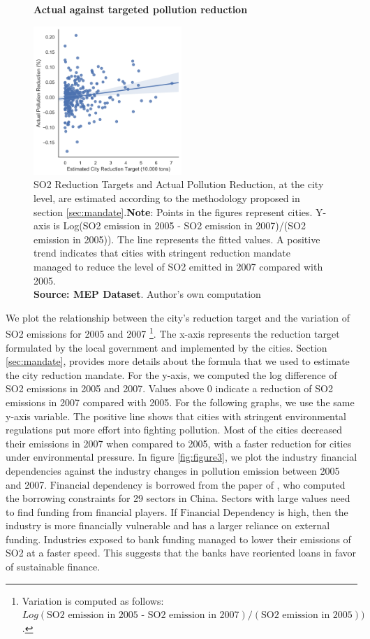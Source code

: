 \documentclass[12pt]{article}
\begin{document}
\begin{figure}[ht]
    \centering
    \textbf{Actual against targeted pollution reduction}\par\medskip
    \includegraphics[width=0.5\textwidth]{fig_2}
    \caption{SO2 Reduction Targets and Actual Pollution Reduction, at the city level, are estimated according to the methodology proposed in section \ref{sec:mandate}.\textbf{Note}: Points in the figures represent cities. Y-axis is Log(SO2 emission in 2005 - SO2 emission in 2007)/(SO2 emission in 2005)). The line represents the fitted values. A positive trend indicates that cities with stringent reduction mandate managed to reduce the level of SO2 emitted in 2007 compared with 2005. \\
    \textbf{Source: MEP Dataset}. Author's own computation}
    \label{fig:figure2}
\end{figure}

We plot the relationship between the city’s reduction target and the variation of SO2 emissions for 2005 and 2007 \footnote{Variation is computed as follows: $Log(\text{SO2 emission in 2005 - SO2 emission in 2007})/(\text{SO2 emission in 2005}))$.}. The x-axis represents the reduction target formulated by the local government and implemented by the cities. Section \ref{sec:mandate}, provides more details about the formula that we used to estimate the city reduction mandate. For the y-axis, we computed the log difference of SO2 emissions in 2005 and 2007. Values above 0 indicate a reduction of SO2 emissions in 2007 compared with 2005. For the following graphs, we use the same y-axis variable. The positive line shows that cities with stringent environmental regulations put more effort into fighting pollution. Most of the cities decreased their emissions in 2007 when compared to 2005, with a faster reduction for cities under environmental pressure. In figure \ref{fig:figure3}, we plot the industry financial dependencies against the industry changes in pollution emission between 2005 and 2007. $\text{Financial dependency}$ is borrowed from the paper of \cite{Fan2015-bm}, who computed the borrowing constraints for 29 sectors in China. Sectors with large values need to find funding from financial players. If $\text{Financial Dependency}$ is high, then the industry is more financially vulnerable and has a larger reliance on external funding. Industries exposed to bank funding managed to lower their emissions of SO2 at a faster speed. This suggests that the banks have reoriented loans in favor of sustainable finance. 
\end{document}
